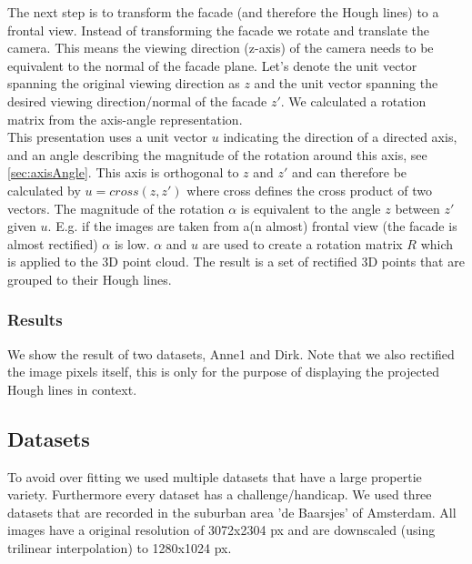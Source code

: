 The next step is to transform the facade (and therefore the Hough lines) to a
frontal view. Instead of transforming the facade we rotate and translate the camera. 
This means the viewing direction (z-axis) of the camera needs
to be equivalent to the normal of the facade plane. Let's denote the
unit vector spanning the original viewing direction as $z$ and the
unit vector spanning the desired viewing direction/normal of the facade $z'$.
We calculated a rotation matrix from the axis-angle representation.\\

This presentation uses a unit vector $u$ indicating the direction of a directed axis, and an
angle describing the magnitude of the rotation around this axis, see
\ref{sec:axisAngle}.
This axis is orthogonal to $z$ and $z'$ and can therefore be
calculated by $u = cross(z,z')$ where cross defines the cross product of
two vectors.
The magnitude of the rotation $\alpha$ is equivalent to the angle $z$ between $z'$ given $u$. 
E.g. if the images are taken from a(n almost) frontal view (the facade is almost rectified) $\alpha$ is low.
$\alpha$ and $u$ are used to create a rotation matrix $R$ which is applied to the 3D point cloud.
The result is a set of rectified 3D points that are grouped to their Hough lines.

\subsubsection{Results} %
We show the result of two datasets, Anne1 and Dirk.
Note that we also rectified the image pixels itself, this is only for
the purpose of displaying the projected Hough lines in context.

\clearpage

\newpage
{}




\subsection{Datasets}
To avoid over fitting we used multiple datasets that have a large propertie
variety. Furthermore every dataset has a challenge/handicap.
We used three datasets that are recorded in the suburban area
'de Baarsjes' of Amsterdam.  All images have a original resolution of 3072x2304
px and are downscaled (using trilinear interpolation) to 1280x1024 px.

